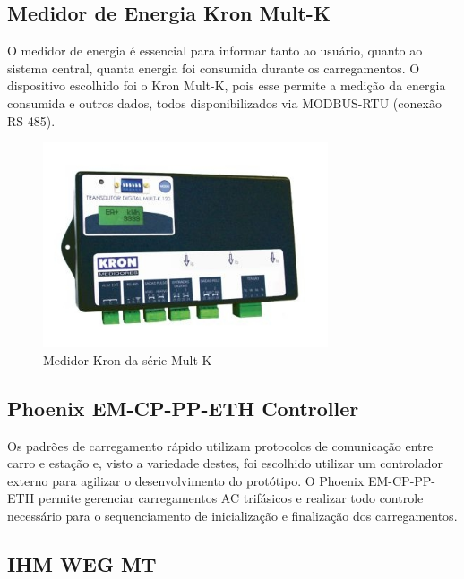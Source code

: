     \subsection{Medidor de Energia Kron Mult-K}

      O medidor de energia é essencial para informar tanto ao usuário, quanto ao sistema central, quanta energia foi consumida durante os carregamentos. O dispositivo escolhido foi o Kron Mult-K, pois esse permite a medição da energia consumida e outros dados, todos disponibilizados via MODBUS-RTU (conexão RS-485).

      \begin{figure}[H]
        \begin{center}
          \includegraphics[width=0.75\textwidth,natwidth=400,natheight=288]{assets/images/devices-kron.jpg}
          \caption{Medidor Kron da série Mult-K}
          \label{fig:kron}
        \end{center}
      \end{figure}

    \subsection{Phoenix EM-CP-PP-ETH Controller}

      Os padrões de carregamento rápido utilizam protocolos de comunicação entre carro e estação e, visto a variedade destes, foi escolhido utilizar um controlador externo para agilizar o desenvolvimento do protótipo. O Phoenix EM-CP-PP-ETH permite gerenciar carregamentos AC trifásicos e realizar todo controle necessário para o sequenciamento de inicialização e finalização dos carregamentos.

    \subsection{IHM WEG MT}

